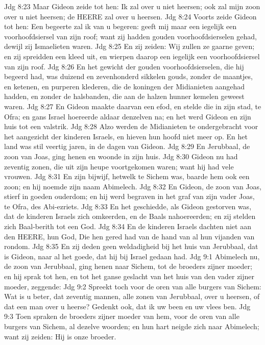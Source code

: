 Jdg 8:23  Maar Gideon zeide tot hen: Ik zal over u niet heersen; ook zal mijn zoon over u niet heersen; de HEERE zal over u heersen.
Jdg 8:24  Voorts zeide Gideon tot hen: Een begeerte zal ik van u begeren: geeft mij maar een iegelijk een voorhoofdsiersel van zijn roof; want zij hadden gouden voorhoofdsierselen gehad, dewijl zij Ismaelieten waren.
Jdg 8:25  En zij zeiden: Wij zullen ze gaarne geven; en zij spreidden een kleed uit, en wierpen daarop een iegelijk een voorhoofdsiersel van zijn roof.
Jdg 8:26  En het gewicht der gouden voorhoofdsierselen, die hij begeerd had, was duizend en zevenhonderd sikkelen gouds, zonder de maantjes, en ketenen, en purperen klederen, die de koningen der Midianieten aangehad hadden, en zonder de halsbanden, die aan de halzen hunner kemelen geweest waren.
Jdg 8:27  En Gideon maakte daarvan een efod, en stelde die in zijn stad, te Ofra; en gans Israel hoereerde aldaar denzelven na; en het werd Gideon en zijn huis tot een valstrik.
Jdg 8:28  Alzo werden de Midianieten te ondergebracht voor het aangezicht der kinderen Israels, en hieven hun hoofd niet meer op. En het land was stil veertig jaren, in de dagen van Gideon.
Jdg 8:29  En Jerubbaal, de zoon van Joas, ging henen en woonde in zijn huis.
Jdg 8:30  Gideon nu had zeventig zonen, die uit zijn heupe voortgekomen waren; want hij had vele vrouwen.
Jdg 8:31  En zijn bijwijf, hetwelk te Sichem was, baarde hem ook een zoon; en hij noemde zijn naam Abimelech.
Jdg 8:32  En Gideon, de zoon van Joas, stierf in goeden ouderdom; en hij werd begraven in het graf van zijn vader Joas, te Ofra, des Abi-ezriets.
Jdg 8:33  En het geschiedde, als Gideon gestorven was, dat de kinderen Israels zich omkeerden, en de Baals nahoereerden; en zij stelden zich Baal-berith tot een God.
Jdg 8:34  En de kinderen Israels dachten niet aan den HEERE, hun God, Die hen gered had van de hand van al hun vijanden van rondom.
Jdg 8:35  En zij deden geen weldadigheid bij het huis van Jerubbaal, dat is Gideon, naar al het goede, dat hij bij Israel gedaan had.
Jdg 9:1  Abimelech nu, de zoon van Jerubbaal, ging henen naar Sichem, tot de broeders zijner moeder; en hij sprak tot hen, en tot het ganse geslacht van het huis van den vader zijner moeder, zeggende:
Jdg 9:2  Spreekt toch voor de oren van alle burgers van Sichem: Wat is u beter, dat zeventig mannen, alle zonen van Jerubbaal, over u heersen, of dat een man over u heerse? Gedenkt ook, dat ik uw been en uw vlees ben.
Jdg 9:3  Toen spraken de broeders zijner moeder van hem, voor de oren van alle burgers van Sichem, al dezelve woorden; en hun hart neigde zich naar Abimelech; want zij zeiden: Hij is onze broeder.
